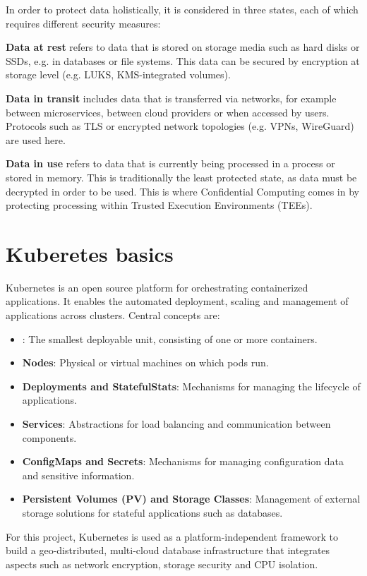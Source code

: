 In order to protect data holistically, it is considered in three states, each of which requires different security measures:

\textbf{Data at rest} refers to data that is stored on storage media such as hard disks or SSDs, e.g. in databases or file systems. This data can be secured by encryption at storage level (e.g. LUKS, KMS-integrated volumes).

\textbf{Data in transit} includes data that is transferred via networks, for example between microservices, between cloud providers or when accessed by users. Protocols such as TLS or encrypted network topologies (e.g. VPNs, WireGuard) are used here.

\textbf{Data in use} refers to data that is currently being processed in a process or stored in memory. This is traditionally the least protected state, as data must be decrypted in order to be used. This is where Confidential Computing comes in by protecting processing within Trusted Execution Environments (TEEs).

\section{Kuberetes basics}

Kubernetes is an open source platform for orchestrating containerized applications. It enables the automated deployment, scaling and management of applications across clusters. Central concepts are:


\begin{itemize}
\item {}: The smallest deployable unit, consisting of one or more containers.
\item \textbf{Nodes}: Physical or virtual machines on which pods run.
\item \textbf{Deployments and StatefulStats}: Mechanisms for managing the lifecycle of applications.
\item \textbf{Services}: Abstractions for load balancing and communication between components.
\item \textbf{ConfigMaps and Secrets}: Mechanisms for managing configuration data and sensitive information.
\item \textbf{Persistent Volumes (PV) and Storage Classes}: Management of external storage solutions for stateful applications such as databases.
\end{itemize}

For this project, Kubernetes is used as a platform-independent framework to build a geo-distributed, multi-cloud database infrastructure that integrates aspects such as network encryption, storage security and CPU isolation.

